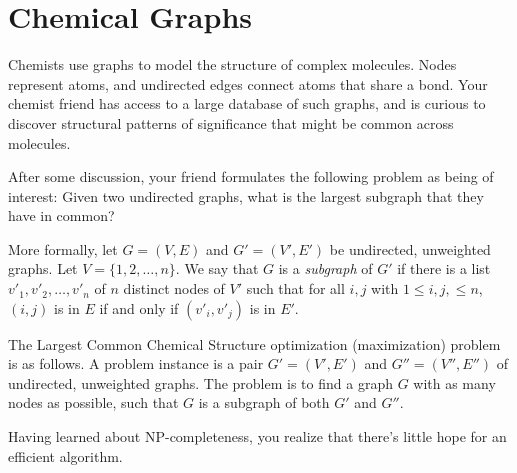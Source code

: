 \documentclass[11pt]{article}
\begin{document}
\section{Chemical Graphs}

Chemists use graphs to model the structure of complex molecules.
Nodes represent atoms, and undirected edges connect atoms that share a bond.
Your chemist friend has access to a large database of such graphs, and is curious to discover structural patterns of significance that might be common across molecules.

After some discussion, your friend formulates the following problem as being of
interest: Given two undirected graphs, what is the largest subgraph
that they have in common?

More formally, let $G = (V,E)$ and $G' = (V',E')$ be undirected, unweighted graphs.
Let $V = \{1,2,\ldots,n\}$. We say that $G$ is a {\em subgraph} of $G'$ if
there is a list $v'_1, v'_2, \ldots, v'_n$ of $n$ distinct nodes of $V'$
such that for all $i,j$ with $1\le i,j,\le n$, $(i,j)$ is in $E$ if and only if $(v'_i,v'_j)$ is in $E'$.

The Largest Common Chemical Structure optimization (maximization) problem is as follows.
A problem instance is a pair $G' = (V',E')$ and $G'' = (V'',E'')$ of undirected, unweighted graphs. The problem is to find a graph $G$ with as many nodes as possible, such that $G$ is a subgraph of both $G'$ and $G''$.

Having learned about NP-completeness, you realize that there's little hope for an efficient algorithm.
\end{document}

